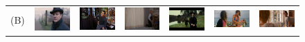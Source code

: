 \begin{figure}[t!]
\begin{center}
\begin{tabular}{ccccccc}
\large{(B)}
& \includegraphics[width=0.12\linewidth]
  {fig/pos/08.jpg} 
& \includegraphics[width=0.12\linewidth]
  {fig/pos/02.jpg}  
& \includegraphics[width=0.12\linewidth]
  {fig/pos/12.jpg}   
& \includegraphics[width=0.12\linewidth]
  {fig/pos/11.jpg}
& \includegraphics[width=0.12\linewidth]
  {fig/pos/05.jpg}  
& \includegraphics[width=0.12\linewidth]
  {fig/pos/01.jpg}
\\
\end{tabular}


\end{center}
\end{figure}
